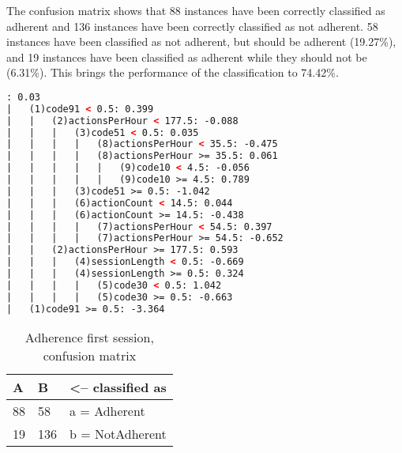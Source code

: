 The confusion matrix shows that 88 instances have been correctly classified as adherent and 136 instances have been correctly classified as not adherent. 58 instances have been classified as not adherent, but should be adherent (19.27\%), and 19 instances have been classified as adherent while they should not be (6.31\%). This brings the performance of the classification to 74.42\%.

\begin{lstlisting}[caption={Adherence first session, \\ ADTree decision tree}, label=listing:adherenceFirstTree, float=htpb, language=xml]
: 0.03
|	(1)code91 < 0.5: 0.399
|	|	(2)actionsPerHour < 177.5: -0.088
|	|	|	(3)code51 < 0.5: 0.035
|	|	|	|	(8)actionsPerHour < 35.5: -0.475
|	|	|	|	(8)actionsPerHour >= 35.5: 0.061
|	|	|	|	|	(9)code10 < 4.5: -0.056
|	|	|	|	|	(9)code10 >= 4.5: 0.789
|	|	|	(3)code51 >= 0.5: -1.042
|	|	|	(6)actionCount < 14.5: 0.044
|	|	|	(6)actionCount >= 14.5: -0.438
|	|	|	|	(7)actionsPerHour < 54.5: 0.397
|	|	|	|	(7)actionsPerHour >= 54.5: -0.652
|	|	(2)actionsPerHour >= 177.5: 0.593
|	|	|	(4)sessionLength < 0.5: -0.669
|	|	|	(4)sessionLength >= 0.5: 0.324
|	|	|	|	(5)code30 < 0.5: 1.042
|	|	|	|	(5)code30 >= 0.5: -0.663
|	(1)code91 >= 0.5: -3.364
\end{lstlisting}

\begin{table}[]
	\centering
	\caption{Adherence first session, \\confusion matrix}
	\label{table:adherenceFirstMatrix}
	\begin{tabular}{@{}ll|l@{}}
		\toprule
		\textbf{A} & \textbf{B} & \textless-- classified as \\ \midrule
		88         & 58         & a = Adherent              \\
		19         & 136        & b = NotAdherent          
	\end{tabular}
\end{table}